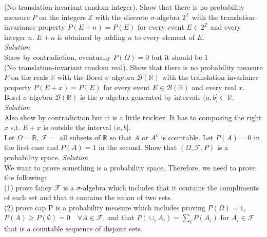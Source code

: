 \documentclass[11pt]{article}
\begin{document}
 (No translation-invariant random integer). Show that there is no probability measure $P$ on the integers $\mathds{Z}$ with the discrete
$\sigma$-algebra $2^{\mathds{Z}}$ with the translation-invariance property $P(E + n) = P(E)$ for every event $E \in 2^{\mathds{Z}}$ and every integer $n$. $E+n$ is obtained by adding $n$ to every element of $E$.
\\
\textit{ Solution} \\
Show by contradiction, eventually $P(\Omega) = 0$ but it should be 1 \\

  (No translation-invariant random real). Show that there is no probability measure $P$ on the reals $\mathds{R}$ with the Borel
$\sigma$-algebra $\mathcal{B}(\mathds{R})$ with the translation-invariance property $P(E + x) = P(E)$ for every event $E \in \mathcal{B}(\mathds{R})$ and every real $x$. Borel $\sigma$-algebra $\mathcal{B}(\mathds{R})$ is the $\sigma$-algebra generated by intervals $(a,b] \subset \mathds{R}$.
\\
\textit{ Solution} \\
Also show by contradiction but it is a little trickier. It has to composing the right $x$ s.t. $E + x$ is outside the interval $(a, b]$.\\

 Let $\Omega=\mathds{R}$, $\mathcal{F}=$ all subsets of $\mathds{R}$ so that $A$ or $A^c$ is countable. Let $P(A)=0$ in the first case and $P(A)=1$ in the second. Show that $(\Omega, \mathcal{F}, P)$ is a probability space.
\textit{ Solution} \\
We want to prove something is a probability space. Therefore, we need to prove the following: \\
(1) prove fancy $\mathcal{F}$ is a $\sigma$-algebra which includes that it contains the compliments of each set and that it contains the union of two sets. \\
(2) prove cap P is a probability measure which includes proving 
$P(\Omega) = 1$, $P(A) \geq P(\emptyset) = 0 \quad \forall A \in \mathcal{F}$, 
and that $P(\cup_i A_i) = \sum_i P(A_i)$ for $A_i \in \mathcal{F}$ 
that is a countable sequence of disjoint sets.
\end{document}
